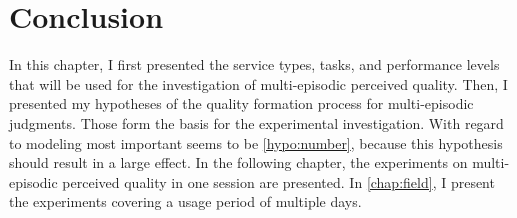 \section{Conclusion}
In this chapter, I first presented the service types, tasks, and performance levels that will be used for the investigation of multi-episodic perceived quality.
Then, I presented my hypotheses of the quality formation process for multi-episodic judgments.
Those form the basis for the experimental investigation.
With regard to modeling most important seems to be \autoref{hypo:number}, because this hypothesis should result in a large effect.
In the following chapter, the experiments on multi-episodic perceived quality in one session are presented.
In \autoref{chap:field}, I present the experiments covering a usage period of multiple days. 
